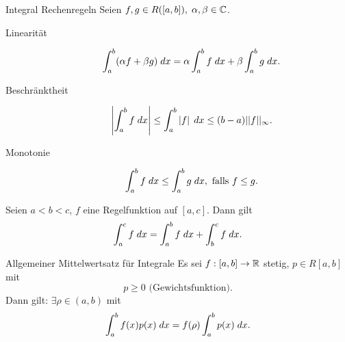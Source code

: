 \documentclass[main.tex]{subfiles}
\begin{document}
\begin{karte}{Integral Rechenregeln}
    Seien \( f,g \in R([a,b]),\; \alpha, \beta \in \C \).
    \begin{description}
        \item[Linearität] \[ \integral{(\alpha f + \beta g)}{a}{b}
        = \alpha \integral{f}{a}{b} + \beta \integral{g}{a}{b}. \]
        \item[Beschränktheit] \[ \abs{\integral{f}{a}{b}} \leq 
        \integral{\abs{f}}{a}{b} 
        \leq (b-a)||f||_\infty. \]
        \item[Monotonie] \[ \integral{f}{a}{b} 
        \leq \integral{g}{a}{b}, \text{ falls } f \leq g. \]
    \end{description}
    Seien \( a < b < c \), \(f\) eine Regelfunktion auf 
    \( [a,c] \). Dann gilt 
    \[ \integral{f}{a}{c} 
    = \integral{f}{a}{b} + \integral{f}{b}{c}. \]
\end{karte}

\begin{karte}{Allgemeiner Mittelwertsatz für Integrale}
    Es sei \( \abb{f}{[a,b]}{\R} \) stetig, 
    \( p \in R[a,b] \) mit 
    \[ p \geq 0 \text{ (Gewichtsfunktion)}. \]
    Dann gilt: \( \exists \rho \in (a,b) \) mit 
    \[ \integral{f(x) p(x)}{a}{b} 
    = f(\rho) \integral{p(x)}{a}{b}. \]
\end{karte}
\end{document}
